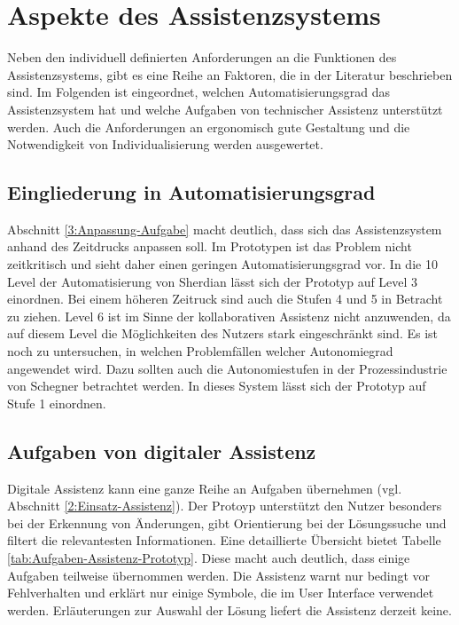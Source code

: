 \section{Aspekte des Assistenzsystems}
Neben den individuell definierten Anforderungen an die Funktionen des Assistenzsystems, gibt es eine Reihe an Faktoren, die in der Literatur beschrieben sind. Im Folgenden ist eingeordnet, welchen Automatisierungsgrad das Assistenzsystem hat und welche Aufgaben von technischer Assistenz unterstützt werden. Auch die Anforderungen an ergonomisch gute Gestaltung und die Notwendigkeit von Individualisierung werden ausgewertet.

\subsection*{Eingliederung in Automatisierungsgrad}
Abschnitt \ref{3:Anpassung-Aufgabe} macht deutlich, dass sich das Assistenzsystem anhand des Zeitdrucks anpassen soll. Im Prototypen ist das Problem nicht zeitkritisch und sieht daher einen geringen Automatisierungsgrad vor. In die 10 Level der Automatisierung von Sherdian \cite{Wandke2005} lässt sich der Prototyp auf Level 3 einordnen. Bei einem höheren Zeitruck sind auch die Stufen 4 und 5 in Betracht zu ziehen. Level 6 ist im Sinne der kollaborativen Assistenz nicht anzuwenden, da auf diesem Level die Möglichkeiten des Nutzers stark eingeschränkt sind. Es ist noch zu untersuchen, in welchen Problemfällen welcher Autonomiegrad angewendet wird. Dazu sollten auch die Autonomiestufen in der Prozessindustrie von Schegner \cite{Schegner2017} betrachtet werden. In dieses System lässt sich der Prototyp auf Stufe 1 einordnen.

\subsection*{Aufgaben von digitaler Assistenz}
Digitale Assistenz kann eine ganze Reihe an Aufgaben übernehmen (vgl. Abschnitt \ref{2:Einsatz-Assistenz}). Der Protoyp unterstützt den Nutzer besonders bei der Erkennung von Änderungen, gibt Orientierung bei der Lösungssuche und filtert die relevantesten Informationen. Eine detaillierte Übersicht bietet Tabelle \ref{tab:Aufgaben-Assistenz-Prototyp}. Diese macht auch deutlich, dass einige Aufgaben teilweise übernommen werden. Die Assistenz warnt nur bedingt vor Fehlverhalten und erklärt nur einige Symbole, die im User Interface verwendet werden. Erläuterungen zur Auswahl der Lösung liefert die Assistenz derzeit keine.

